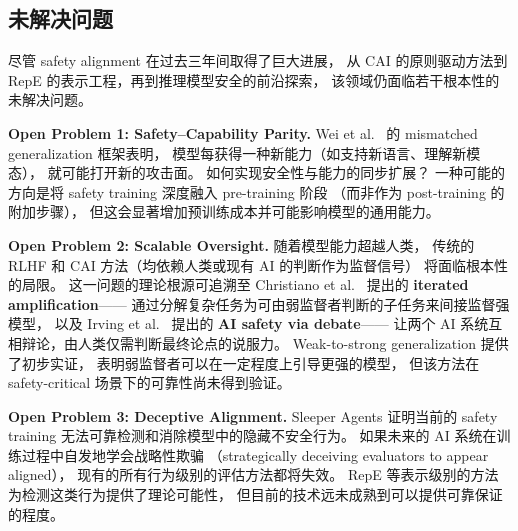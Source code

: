 
\subsection{未解决问题}
\label{sec:t3-open}

尽管 safety alignment 在过去三年间取得了巨大进展，
从 CAI 的原则驱动方法到 RepE 的表示工程，再到推理模型安全的前沿探索，
该领域仍面临若干根本性的未解决问题。

\begin{openproblembox}
\textbf{Open Problem 1: Safety--Capability Parity.}
Wei et al.\ \cite{wei2023jailbroken} 的 mismatched generalization 框架表明，
模型每获得一种新能力（如支持新语言、理解新模态），
就可能打开新的攻击面。
如何实现安全性与能力的同步扩展？
一种可能的方向是将 safety training 深度融入 pre-training 阶段
（而非作为 post-training 的附加步骤），
但这会显著增加预训练成本并可能影响模型的通用能力。
\end{openproblembox}

\begin{openproblembox}
\textbf{Open Problem 2: Scalable Oversight.}
随着模型能力超越人类，
传统的 RLHF 和 CAI 方法（均依赖人类或现有 AI 的判断作为监督信号）
将面临根本性的局限。
这一问题的理论根源可追溯至
Christiano et al.\ \cite{christiano2018oversight} 提出的 \textbf{iterated amplification}——
通过分解复杂任务为可由弱监督者判断的子任务来间接监督强模型，
以及 Irving et al.\ \cite{irving2018debate} 提出的 \textbf{AI safety via debate}——
让两个 AI 系统互相辩论，由人类仅需判断最终论点的说服力。
Weak-to-strong generalization \cite{burns2023weaktostrong} 提供了初步实证，
表明弱监督者可以在一定程度上引导更强的模型，
但该方法在 safety-critical 场景下的可靠性尚未得到验证。
\end{openproblembox}

\begin{openproblembox}
\textbf{Open Problem 3: Deceptive Alignment.}
Sleeper Agents \cite{hubinger2024sleeper} 证明当前的 safety training
无法可靠检测和消除模型中的隐藏不安全行为。
如果未来的 AI 系统在训练过程中自发地学会战略性欺骗
（strategically deceiving evaluators to appear aligned），
现有的所有行为级别的评估方法都将失效。
RepE 等表示级别的方法为检测这类行为提供了理论可能性，
但目前的技术远未成熟到可以提供可靠保证的程度。
\end{openproblembox}

